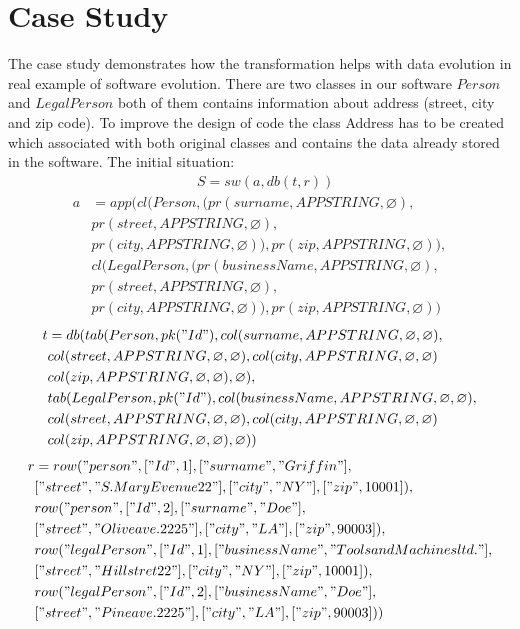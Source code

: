 \documentclass[11pt]{article}
\begin{document}
\section{Case Study}
The case study demonstrates how the transformation helps with data evolution in real example of software evolution. There are two classes in our software $Person$ and $LegalPerson$ both of them contains information about address (street, city and zip code). To improve the design of code the class Address has to be created which associated with both original classes and contains the data already stored in the software. The initial situation:
\begin{align*}
&	S = sw(a, db(t,r))
\end{align*}
\begin{align*}
a &= app(cl(Person, (pr(surname, APPSTRING, \varnothing), \\
& pr(street, APPSTRING, \varnothing), \\
& pr(city, APPSTRING, \varnothing)), pr(zip, APPSTRING, \varnothing)), \\
& cl(LegalPerson, (pr(businessName, APPSTRING, \varnothing), \\
& pr(street, APPSTRING, \varnothing), \\
& pr(city, APPSTRING, \varnothing)), pr(zip, APPSTRING, \varnothing))
\end{align*}
\begin{align*}
t &= db(tab(Person, pk("Id"), col(surname, APPSTRING, \varnothing, \varnothing), \\
& col(street, APPSTRING, \varnothing, \varnothing), col(city, APPSTRING, \varnothing, \varnothing) \\
& col(zip, APPSTRING, \varnothing, \varnothing), \varnothing), \\
& tab(LegalPerson, pk("Id"),  col(businessName, APPSTRING, \varnothing, \varnothing), \\
& col(street, APPSTRING, \varnothing, \varnothing), col(city, APPSTRING, \varnothing, \varnothing) \\
& col(zip, APPSTRING, \varnothing, \varnothing), \varnothing)) 
\end{align*}
\begin{align*}
r &= row("person", ["Id", 1], ["surname", "Griffin"], \\
& ["street", "S. Mary Evenue 22"], ["city", "NY"], ["zip", 10001]), \\
& row("person", ["Id", 2], ["surname", "Doe"], \\
& ["street", "Olive ave. 2225"], ["city", "LA"], ["zip", 90003]), \\
& row("legalPerson", ["Id", 1], ["businessName", "Tools and Machines ltd."], \\
& ["street", "Hill stret 22"], ["city", "NY"], ["zip", 10001]), \\
& row("legalPerson", ["Id", 2], ["businessName", "Doe"], \\
& ["street", "Pine ave. 2225"], ["city", "LA"], ["zip", 90003]))
\end{align*}
\end{document}
